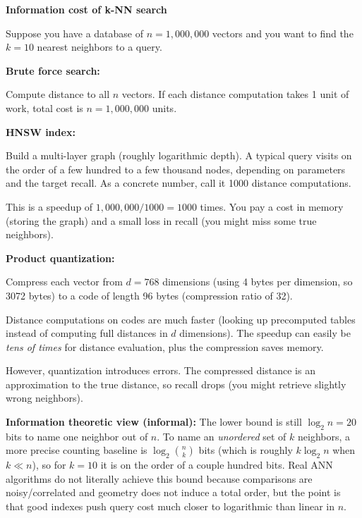 \begin{examplebox}
\textbf{Information cost of k-NN search}

\vspace{0.5em}

Suppose you have a database of $n = 1{,}000{,}000$ vectors and you want to find the $k = 10$ nearest neighbors to a query.

\vspace{0.5em}

\textbf{Brute force search:}

Compute distance to all $n$ vectors. If each distance computation takes 1 unit of work, total cost is $n = 1{,}000{,}000$ units.

\vspace{0.5em}

\textbf{HNSW index:}

Build a multi-layer graph (roughly logarithmic depth). A typical query visits on the order of a few hundred to a few thousand nodes, depending on parameters and the target recall. As a concrete number, call it 1000 distance computations.

This is a speedup of $1{,}000{,}000 / 1000 = 1000$ times. You pay a cost in memory (storing the graph) and a small loss in recall (you might miss some true neighbors).

\vspace{0.5em}

\textbf{Product quantization:}

Compress each vector from $d = 768$ dimensions (using 4 bytes per dimension, so 3072 bytes) to a code of length 96 bytes (compression ratio of 32).

Distance computations on codes are much faster (looking up precomputed tables instead of computing full distances in $d$ dimensions). The speedup can easily be \emph{tens of times} for distance evaluation, plus the compression saves memory.

However, quantization introduces errors. The compressed distance is an approximation to the true distance, so recall drops (you might retrieve slightly wrong neighbors).

\vspace{0.5em}

\textbf{Information theoretic view (informal):} The lower bound is still $\log_2 n = 20$ bits to name one neighbor out of $n$. To name an \emph{unordered} set of $k$ neighbors, a more precise counting baseline is $\log_2 \binom{n}{k}$ bits (which is roughly $k\log_2 n$ when $k \ll n$), so for $k=10$ it is on the order of a couple hundred bits. Real ANN algorithms do not literally achieve this bound because comparisons are noisy/correlated and geometry does not induce a total order, but the point is that good indexes push query cost much closer to logarithmic than linear in $n$.
\end{examplebox}

